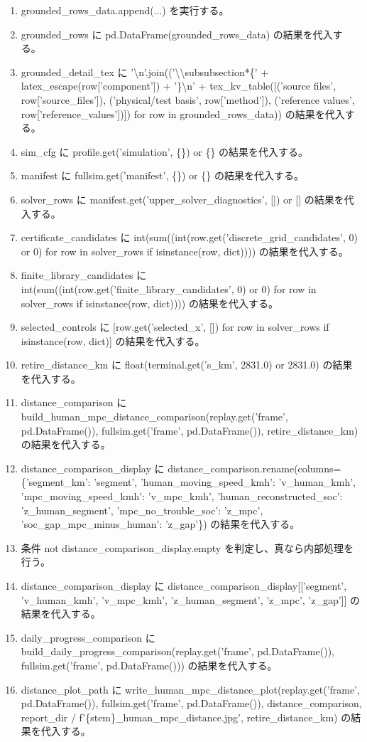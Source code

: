 \documentclass[a4paper,11pt]{article}
\begin{document}
\begin{enumerate}[leftmargin=1.8em]
\item   grounded\_rows\_data.append(...) を実行する。
\item grounded\_rows に pd.DataFrame(grounded\_rows\_data) の結果を代入する。
\item grounded\_detail\_tex に '\textbackslash{}n'.join(('\textbackslash{}\textbackslash{}subsubsection*\{' + latex\_escape(row['component']) + '\}\textbackslash{}n' + tex\_kv\_table([('source files', row['source\_files']), ('physical/test basis', row['method']), ('reference values', row['reference\_values'])]) for row in grounded\_rows\_data)) の結果を代入する。
\item sim\_cfg に profile.get('simulation', \{\}) or \{\} の結果を代入する。
\item manifest に fullsim.get('manifest', \{\}) or \{\} の結果を代入する。
\item solver\_rows に manifest.get('upper\_solver\_diagnostics', []) or [] の結果を代入する。
\item certificate\_candidates に int(sum((int(row.get('discrete\_grid\_candidates', 0) or 0) for row in solver\_rows if isinstance(row, dict)))) の結果を代入する。
\item finite\_library\_candidates に int(sum((int(row.get('finite\_library\_candidates', 0) or 0) for row in solver\_rows if isinstance(row, dict)))) の結果を代入する。
\item selected\_controls に [row.get('selected\_x', []) for row in solver\_rows if isinstance(row, dict)] の結果を代入する。
\item retire\_distance\_km に float(terminal.get('s\_km', 2831.0) or 2831.0) の結果を代入する。
\item distance\_comparison に build\_human\_mpc\_distance\_comparison(replay.get('frame', pd.DataFrame()), fullsim.get('frame', pd.DataFrame()), retire\_distance\_km) の結果を代入する。
\item distance\_comparison\_display に distance\_comparison.rename(columns=\{'segment\_km': 'segment', 'human\_moving\_speed\_kmh': 'v\_human\_kmh', 'mpc\_moving\_speed\_kmh': 'v\_mpc\_kmh', 'human\_reconstructed\_soc': 'z\_human\_segment', 'mpc\_no\_trouble\_soc': 'z\_mpc', 'soc\_gap\_mpc\_minus\_human': 'z\_gap'\}) の結果を代入する。
\item 条件 not distance\_comparison\_display.empty を判定し、真なら内部処理を行う。
\item   distance\_comparison\_display に distance\_comparison\_display[['segment', 'v\_human\_kmh', 'v\_mpc\_kmh', 'z\_human\_segment', 'z\_mpc', 'z\_gap']] の結果を代入する。
\item daily\_progress\_comparison に build\_daily\_progress\_comparison(replay.get('frame', pd.DataFrame()), fullsim.get('frame', pd.DataFrame())) の結果を代入する。
\item distance\_plot\_path に write\_human\_mpc\_distance\_plot(replay.get('frame', pd.DataFrame()), fullsim.get('frame', pd.DataFrame()), distance\_comparison, report\_dir / f'\{stem\}\_human\_mpc\_distance.jpg', retire\_distance\_km) の結果を代入する。
            \end{enumerate}
\end{document}

